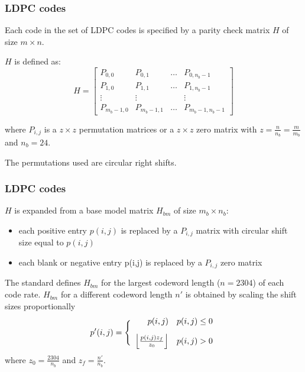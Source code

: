 \documentclass[]{beamer}
\begin{document}
\begin{frame}
\transwipe[direction=0]
\frametitle{LDPC codes}
Each code in the set of LDPC codes is specified by a parity check matrix $H$ of size $m\times n$.

$H$ is defined as:
\begin{equation*}
H = 
	\begin{bmatrix}
		P_{0,0}  & P_{0,1} & \dots & P_{0,n_b-1}\\
		P_{1,0} & P_{1,1}  & \dots & P_{1,n_b-1} \\
		\vdots & \vdots & & \vdots \\
		P_{m_b-1,0} & P_{m_b-1,1} & \dots & P_{m_b-1,n_b-1}
	\end{bmatrix}
\end{equation*}

where $P_{i,j}$ is a $z\times z$ permutation matrices or a $z\times z$ zero matrix with $z = \frac{n}{n_b} = \frac{m}{m_b}$ and $n_b = 24$. 

The permutations used are circular right shifts.

\end{frame}


\begin{frame}
\transwipe[direction=0]
\frametitle{LDPC codes}
$H$ is expanded from a base model matrix $H_{bm}$ of size $m_b\times n_b$:
\begin{itemize}
\item each positive entry $p(i,j)$ is replaced by a $P_{i,j}$ matrix with circular shift size equal to $p(i,j)$
\item each blank or negative entry p(i,j) is replaced by a $P_{i,j}$ zero matrix
\end{itemize}
\vspace{0.3cm}
The standard defines $H_{bm}$ for the largest codeword length ($n = 2304$) of each code rate. $H_{bm}$ for a different codeword length $n'$ is obtained by scaling the shift sizes proportionally
	\begin{equation*}
		p'(i,j) =  \Bigg \{
				\begin{array}{rl}
					p(i,j) & p(i,j) \leq 0 \vspace{0.3cm}\\
					
					\left\lfloor\frac{p(i,j)z_f}{z_0} \right\rfloor & p(i,j) > 0 \\
				\end{array}
	\end{equation*}
where $z_0 = \frac{2304}{n_b}$ and $z_f = \frac{n'}{n_b}$.
\end{frame}
\end{document}
